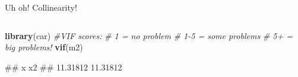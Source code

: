 \documentclass[
  ignorenonframetext,
  aspectratio=169]{beamer}
\newenvironment{Shaded}{\begin{snugshade}}{\end{snugshade}}
\newcommand{\CommentTok}[1]{\textcolor[rgb]{0.56,0.35,0.01}{\textit{#1}}}
\newcommand{\FunctionTok}[1]{\textcolor[rgb]{0.13,0.29,0.53}{\textbf{#1}}}
\newcommand{\NormalTok}[1]{#1}
\let\oldShaded\Shaded %
\let\endoldShaded\endShaded
\renewenvironment{Shaded}{\scriptsize\oldShaded}{\endoldShaded}
\let\oldverbatim\verbatim %
\let\endoldverbatim\endverbatim
\renewenvironment{verbatim}{\tiny\oldverbatim}{\endoldverbatim}
\begin{document}
\begin{frame}[fragile]{Uh oh! Collinearity!}
\begin{columns}[T]
\begin{column}{0.48\textwidth}
\small

\begin{Shaded}
\begin{Highlighting}[]
\FunctionTok{library}\NormalTok{(car)}
\CommentTok{\#VIF scores:}
\CommentTok{\# 1 = no problem}
\CommentTok{\# 1{-}5 = some problems}
\CommentTok{\# 5+ = big problems!}
\FunctionTok{vif}\NormalTok{(m2) }
\end{Highlighting}
\end{Shaded}

\begin{verbatim}
##        x       x2 
## 11.31812 11.31812
\end{verbatim}
\end{column}
\end{columns}
\end{frame}
\end{document}
